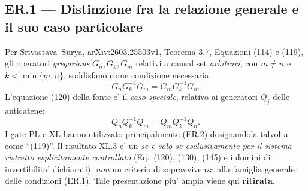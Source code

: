 \documentclass[11pt,a4paper]{article}
\begin{document}
\subsection*{ER.1 --- Distinzione fra la relazione generale e il suo caso particolare}
Per Srivastava--Surya, \href{https://arxiv.org/html/2603.25503v1}{arXiv:2603.25503v1},
Teorema 3.7, Equazioni (114) e (119), gli operatori \emph{gregarious}
$G_n,G_k,G_m$ relativi a causal set \emph{arbitrari}, con $m\ne n$ e
$k<\min\{m,n\}$, soddisfano come condizione necessaria
\begin{equation}
 G_n G_k^{-1}G_m=G_m G_k^{-1}G_n.\tag{ER.1}
\end{equation}
L'equazione (120) della fonte e' il \emph{caso speciale}, relativo ai generatori
$Q_j$ delle anticatene:
\begin{equation}
 Q_n Q_k^{-1}Q_m=Q_m Q_k^{-1}Q_n.\tag{ER.2}
\end{equation}
I gate PL e XL hanno utilizzato principalmente (ER.2) designandola talvolta
come ``(119)''. Il risultato XL.3 e' un \emph{se e solo se esclusivamente per il sistema
ristretto esplicitamente controllato} (Eq.~(120), (130), (145) e i domini di
invertibilita' dichiarati), \emph{non} un criterio di sopravvivenza alla
famiglia generale delle condizioni (ER.1). Tale presentazione piu' ampia
viene qui \textbf{ritirata}.
\end{document}
